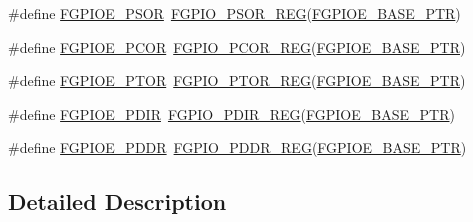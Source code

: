 \begin{DoxyCompactItemize}
\item 
\#define \hyperlink{group___f_g_p_i_o___register___accessor___macros_ga2a3137754a9e64c35baee378b6cabdd5}{F\+G\+P\+I\+O\+E\+\_\+\+P\+S\+OR}~\hyperlink{group___f_g_p_i_o___register___accessor___macros_ga54a29c014c762391371b2f8dce53a89d}{F\+G\+P\+I\+O\+\_\+\+P\+S\+O\+R\+\_\+\+R\+EG}(\hyperlink{group___f_g_p_i_o___peripheral_ga07d1ba914f3ded63431edec77d4544ee}{F\+G\+P\+I\+O\+E\+\_\+\+B\+A\+S\+E\+\_\+\+P\+TR})
\item 
\#define \hyperlink{group___f_g_p_i_o___register___accessor___macros_ga1596d63e5c60f3ee962d345d7848afb5}{F\+G\+P\+I\+O\+E\+\_\+\+P\+C\+OR}~\hyperlink{group___f_g_p_i_o___register___accessor___macros_gafc8a737aad6f10b837eea247f548c2c9}{F\+G\+P\+I\+O\+\_\+\+P\+C\+O\+R\+\_\+\+R\+EG}(\hyperlink{group___f_g_p_i_o___peripheral_ga07d1ba914f3ded63431edec77d4544ee}{F\+G\+P\+I\+O\+E\+\_\+\+B\+A\+S\+E\+\_\+\+P\+TR})
\item 
\#define \hyperlink{group___f_g_p_i_o___register___accessor___macros_gade2396a0521c669453c144aff864476a}{F\+G\+P\+I\+O\+E\+\_\+\+P\+T\+OR}~\hyperlink{group___f_g_p_i_o___register___accessor___macros_ga437196d610550fb3c534d267d06199b8}{F\+G\+P\+I\+O\+\_\+\+P\+T\+O\+R\+\_\+\+R\+EG}(\hyperlink{group___f_g_p_i_o___peripheral_ga07d1ba914f3ded63431edec77d4544ee}{F\+G\+P\+I\+O\+E\+\_\+\+B\+A\+S\+E\+\_\+\+P\+TR})
\item 
\#define \hyperlink{group___f_g_p_i_o___register___accessor___macros_ga9327c2aa4b8fd58ab75ef5fa46a6c9cf}{F\+G\+P\+I\+O\+E\+\_\+\+P\+D\+IR}~\hyperlink{group___f_g_p_i_o___register___accessor___macros_gacfddb4a1de217cf1491c5dd88fca546a}{F\+G\+P\+I\+O\+\_\+\+P\+D\+I\+R\+\_\+\+R\+EG}(\hyperlink{group___f_g_p_i_o___peripheral_ga07d1ba914f3ded63431edec77d4544ee}{F\+G\+P\+I\+O\+E\+\_\+\+B\+A\+S\+E\+\_\+\+P\+TR})
\item 
\#define \hyperlink{group___f_g_p_i_o___register___accessor___macros_ga808099029ad996db9abe97d36a1c7b9d}{F\+G\+P\+I\+O\+E\+\_\+\+P\+D\+DR}~\hyperlink{group___f_g_p_i_o___register___accessor___macros_gab7e22aa4413933045d874108bdf09478}{F\+G\+P\+I\+O\+\_\+\+P\+D\+D\+R\+\_\+\+R\+EG}(\hyperlink{group___f_g_p_i_o___peripheral_ga07d1ba914f3ded63431edec77d4544ee}{F\+G\+P\+I\+O\+E\+\_\+\+B\+A\+S\+E\+\_\+\+P\+TR})
\end{DoxyCompactItemize}


\subsection{Detailed Description}


